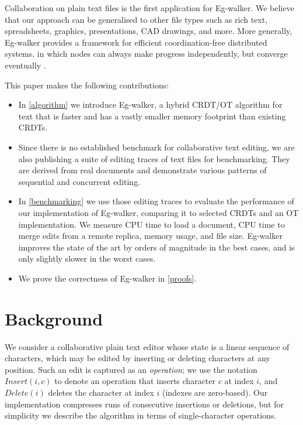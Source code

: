 \documentclass[sigplan,10pt]{acmart}
\newcommand{\algname}{Eg-walker\xspace}
\begin{document}
Collaboration on plain text files is the first application for \algname.
We believe that our approach can be generalised to other file types such as rich text, spreadsheets, graphics, presentations, CAD drawings, and more.
More generally, \algname provides a framework for efficient coordination-free distributed systems, in which nodes can always make progress independently, but converge eventually \cite{Hellerstein2010}.

This paper makes the following contributions:

\begin{itemize}
\item In \autoref{algorithm} we introduce \algname, a hybrid CRDT/OT algorithm for text that is faster and has a vastly smaller memory footprint than existing CRDTs.
\item Since there is no established benchmark for collaborative text editing, we are also publishing a suite of editing traces of text files for benchmarking. They are derived from real documents and demonstrate various patterns of sequential and concurrent editing.
\item In \autoref{benchmarking} we use those editing traces to evaluate the performance of our implementation of \algname, comparing it to selected CRDTs and an OT implementation. We measure CPU time to load a document, CPU time to merge edits from a remote replica, memory usage, and file size. \algname improves the state of the art by orders of magnitude in the best cases, and is only slightly slower in the worst cases.
\item We prove the correctness of \algname in \autoref{proofs}.
\end{itemize}

\section{Background}

We consider a collaborative plain text editor whose state is a linear sequence of characters, which may be edited by inserting or deleting characters at any position.
Such an edit is captured as an \emph{operation}; we use the notation $\mathit{Insert}(i, c)$ to denote an operation that inserts character $c$ at index $i$, and $\mathit{Delete}(i)$ deletes the character at index $i$ (indexes are zero-based).
Our implementation compresses runs of consecutive insertions or deletions, but for simplicity we describe the algorithm in terms of single-character operations.
\end{document}
